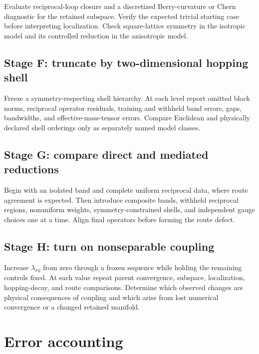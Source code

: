 Evaluate reciprocal-loop closure and a discretized Berry-curvature or Chern
diagnostic for the retained subspace. Verify the expected trivial starting
case before interpreting localization. Check square-lattice symmetry in the
isotropic model and its controlled reduction in the anisotropic model.

\subsection{Stage F: truncate by two-dimensional hopping shell}

Freeze a symmetry-respecting shell hierarchy. At each level report omitted
block norms, reciprocal operator residuals, training and withheld band errors,
gaps, bandwidths, and effective-mass-tensor errors. Compare Euclidean and
physically declared shell orderings only as separately named model classes.

\subsection{Stage G: compare direct and mediated reductions}

Begin with an isolated band and complete uniform reciprocal data, where route
agreement is expected. Then introduce composite bands, withheld reciprocal
regions, nonuniform weights, symmetry-constrained shells, and independent gauge
choices one at a time. Align final operators before forming the route defect.

\subsection{Stage H: turn on nonseparable coupling}

Increase $\lambda_{xy}$ from zero through a frozen sequence while holding the
remaining controls fixed. At each value repeat parent convergence, subspace,
localization, hopping-decay, and route comparisons. Determine which observed
changes are physical consequences of coupling and which arise from lost
numerical convergence or a changed retained manifold.

\section{Error accounting}


